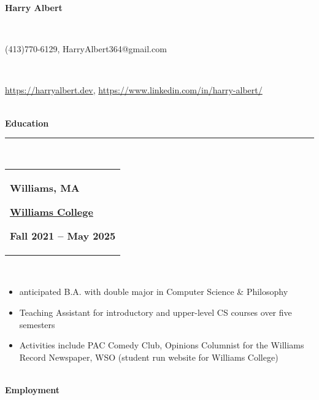 \documentclass[10pt]{extarticle}
\begin{document}
\thispagestyle{empty}
\vspace{-\baselineskip}
\begin{center}
\Large \textbf{Harry Albert}
\end{center}
\vspace{-6.5ex}~\\ 
\vspace{-\baselineskip}
\begin{center}
\normalsize (413)770-6129, HarryAlbert364@gmail.com
\end{center}
\vspace{-6ex}~\\ 
\vspace{-\baselineskip}
\begin{center}
\normalsize \url{https://harryalbert.dev}, \url{https://www.linkedin.com/in/harry-albert/}
\end{center}
\vspace{-6ex}~\\ 
\textbf{Education}\\[-2ex]
\rule{\textwidth}{0.4pt}\\ 
\begin{tabular}{@{}p{\textwidth}}\begin{minipage}[t]{0.333\textwidth}
\raggedright
\textbf{Williams, MA}
\end{minipage}%
\begin{minipage}[t]{0.333\textwidth}
\centering
\textbf{\underline{Williams College}}
\end{minipage}%
\begin{minipage}[t]{0.333\textwidth}
\raggedleft
\textbf{Fall 2021 – May 2025}
\end{minipage}%
\end{tabular}\\[0.5ex]
\vspace{-\baselineskip}
\begin{itemize}[noitemsep,nolistsep]
\item anticipated B.A. with double major in Computer Science \& Philosophy
\item Teaching Assistant for introductory and upper-level CS courses over five semesters
\item Activities include PAC Comedy Club, Opinions Columnist for the Williams Record Newspaper, WSO (student run website for Williams College)
\end{itemize}~\\[-1ex]
\textbf{Employment}\\[-2ex]
\end{document}
